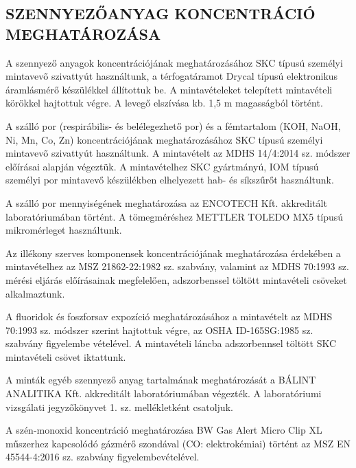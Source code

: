\documentclass[a4paper,12pt]{article}
\begin{document}
	\subsection{SZENNYEZŐANYAG KONCENTRÁCIÓ MEGHATÁROZÁSA}
	
	\begin{adjustwidth}{1cm}{0cm}
		\vspace{1.0em} %
		
		A szennyező anyagok koncentrációjának meghatározásához SKC típusú személyi mintavevő szivattyút használtunk, a térfogatáramot Drycal típusú elektronikus áramlásmérő készülékkel állítottuk be. A mintavételeket telepített mintavételi körökkel hajtottuk végre. A levegő elszívása kb. 1,5 m magasságból történt.
		
		\vspace{1.0em}
		
		A szálló por (respirábilis- és belélegezhető por) és a fémtartalom (KOH, NaOH, Ni, Mn, Co, Zn) koncentrációjának meghatározásához SKC típusú személyi mintavevő szivattyút használtunk. A mintavételt az MDHS 14/4:2014 sz. módszer előírásai alapján végeztük. A mintavételhez SKC gyártmányú, IOM típusú személyi por mintavevő készülékben elhelyezett hab- és síkszűrőt használtunk.
		
		\vspace{1.0em}
		
		A szálló por mennyiségének meghatározása az ENCOTECH Kft. akkreditált laboratóriumában történt. A tömegméréshez METTLER TOLEDO MX5 típusú mikromérleget használtunk.
		
		\vspace{1.0em}
		
		Az illékony szerves komponensek koncentrációjának meghatározása érdekében a mintavételhez az MSZ 21862-22:1982 sz. szabvány, valamint az MDHS 70:1993 sz. mérési eljárás előírásainak megfelelően, adszorbenssel töltött mintavételi csöveket alkalmaztunk.
		
		\vspace{1.0em}
		
		A fluoridok és foszforsav expozíció meghatározásához a mintavételt az MDHS 70:1993 sz. módszer szerint hajtottuk végre, az OSHA ID-165SG:1985 sz. szabvány figyelembe vételével. A mintavételi láncba adszorbennsel töltött SKC mintavételi csövet iktattunk.
		
		\vspace{1.0em}
		
		A minták egyéb szennyező anyag tartalmának meghatározását a BÁLINT ANALITIKA Kft. akkreditált laboratóriumában végezték. A laboratóriumi vizsgálati jegyzőkönyvet 1. sz. mellékletként csatoljuk.
		
		\vspace{1.0em}
		
		A szén-monoxid koncentráció meghatározása BW Gas Alert Micro Clip XL műszerhez kapcsolódó gázmérő szondával (CO: elektrokémiai) történt az MSZ EN 45544-4:2016 sz. szabvány figyelembevételével.
		
	\end{adjustwidth}
	
\end{document}
